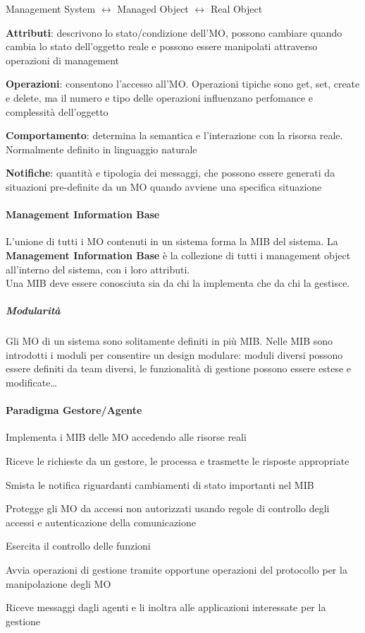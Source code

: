 \documentclass[10pt]{book}
\begin{document}
\begin{center}
Management System $\leftrightarrow$ Managed Object $\leftrightarrow$ Real Object
\end{center}
\begin{list}{}{\textbf{Caratteristiche}}
	\item \textbf{Attributi}: descrivono lo stato/condizione dell'MO, possono cambiare quando cambia lo stato dell'oggetto reale e possono essere manipolati attraverso operazioni di management
	\item \textbf{Operazioni}: consentono l'accesso all'MO. Operazioni tipiche sono get, set, create e delete, ma il numero e tipo delle operazioni influenzano perfomance e complessità dell'oggetto
	\item \textbf{Comportamento}: determina la semantica e l'interazione con la risorsa reale. Normalmente definito in linguaggio naturale
	\item \textbf{Notifiche}: quantità e tipologia dei messaggi, che possono essere generati da situazioni pre-definite da un MO quando avviene una specifica situazione
\end{list}
\paragraph{Management Information Base} L'unione di tutti i MO contenuti in un sistema forma la MIB del sistema. La \textbf{Management Information Base} è la collezione di tutti i management object all'interno del sistema, con i loro attributi.\\
Una MIB deve essere conosciuta sia da chi la implementa che da chi la gestisce.
\subparagraph{Modularità} Gli MO di un sistema sono solitamente definiti in più MIB. Nelle MIB sono introdotti i moduli per consentire un design modulare: moduli diversi possono essere definiti da team diversi, le funzionalità di gestione possono essere estese e modificate\ldots
\paragraph{Paradigma Gestore/Agente}
\begin{list}{}{Agent}
	\item Implementa i MIB delle MO accedendo alle risorse reali
	\item Riceve le richieste da un gestore, le processa e trasmette le risposte appropriate
	\item Smista le notifica riguardanti cambiamenti di stato importanti nel MIB
	\item Protegge gli MO da accessi non autorizzati usando regole di controllo degli accessi e autenticazione della comunicazione
\end{list}
\begin{list}{}{Manager}
	\item Esercita il controllo delle funzioni
	\item Avvia operazioni di gestione tramite opportune operazioni del protocollo per la manipolazione degli MO
	\item Riceve messaggi dagli agenti e li inoltra alle applicazioni interessate per la gestione
\end{list}
\end{document}
